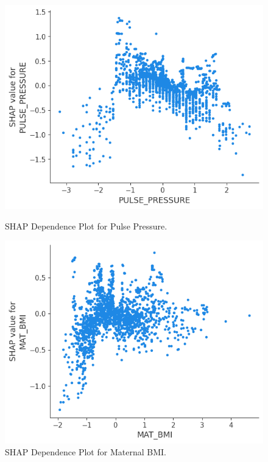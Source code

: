 \documentclass{article}
\begin{document}
\begin{figure}[h]
    \centering
    \begin{minipage}{0.45\textwidth}
        \centering
        \includegraphics[width=\textwidth]{pulse_pressure.png}
        \caption{SHAP Dependence Plot for Pulse Pressure.}
        \label{fig:pulse_pressure}
    \end{minipage}
    \hfill
    \begin{minipage}{0.45\textwidth}
        \centering
        \includegraphics[width=\textwidth]{mat_bmi.png}
        \caption{SHAP Dependence Plot for Maternal BMI.}
        \label{fig:mat_bmi}
    \end{minipage}
\end{figure}
\end{document}
